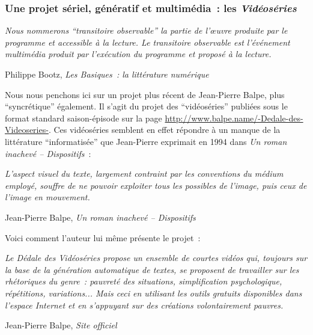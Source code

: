 \documentclass{article}
\newenvironment{citationbox}
{\begin{center}
		\begin{minipage}{.8\textwidth}
		}
		{
		\end{minipage}	
\end{center}
}
\begin{document}
			\subsubsection{Une projet sériel, génératif et multimédia~: les \textit{Vidéoséries}}
				\begin{citationbox}
					\textit{Nous nommerons ``transitoire observable'' la partie de l’œuvre produite par le programme et accessible à la lecture. Le transitoire observable est l’événement multimédia produit par l'exécution du programme et proposé à la lecture.}
					\begin{flushright}
						Philippe Bootz, \textit{Les Basiques~: la littérature numérique} \cite{bootz2006}
					\end{flushright}
				\end{citationbox}
				Nous nous penchons ici sur un projet plus récent de Jean-Pierre Balpe, plus ``syncrétique'' également. Il s'agit du projet des ``vidéoséries'' publiées sous le format standard saison-épisode sur la page \href{http://www.balpe.name/-Dedale-des-Videoseries-}{http://www.balpe.name/-Dedale-des-Videoseries-}. Ces vidéoséries semblent en effet répondre à un manque de la littérature ``informatisée'' que Jean-Pierre exprimait en 1994 dans \textit{Un roman inachevé -- Dispositifs} : 
				\begin{citationbox}
					\textit{L'aspect visuel du texte, largement contraint par les conventions du médium employé, souffre de ne pouvoir exploiter tous les possibles de l'image, puis ceux de l'image en mouvement.}
					\begin{flushright}
						Jean-Pierre Balpe, \textit{Un roman inachevé -- Dispositifs} \cite{balpe1994}
					\end{flushright}
				\end{citationbox}
				Voici comment l'auteur lui même présente le projet~:
				\begin{citationbox}
					\textit{Le Dédale des Vidéoséries propose un ensemble de courtes vidéos qui, toujours sur la base de la génération automatique de textes, se proposent de travailler sur les rhétoriques du genre : pauvreté des situations, simplification psychologique, répétitions, variations... Mais ceci en utilisant les outils gratuits disponibles dans l'espace Internet et en s'appuyant sur des créations volontairement pauvres.}
					\begin{flushright}
						Jean-Pierre Balpe, \textit{Site officiel} \cite{balpe_site}
					\end{flushright}
				\end{citationbox}
				
\end{document}
